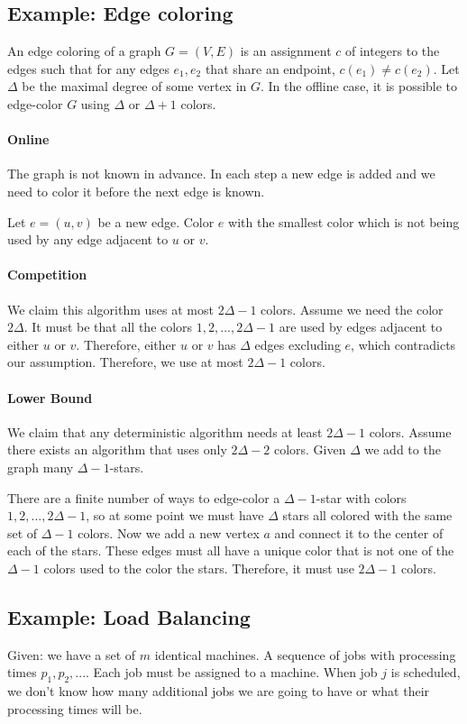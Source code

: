 \documentclass[a4paper]{article}
\begin{document}
\subsection{Example: Edge coloring}
An edge coloring of a graph $G=(V,E)$ is an assignment $c$ of integers to the edges such that for any edges $e_1, e_2$ that share an endpoint, $c(e_1) \ne c(e_2)$.
Let $\Delta$ be the maximal degree of some vertex in $G$.
In the offline case, it is possible to edge-color $G$ using $\Delta$ or $\Delta+1$ colors.

\paragraph{Online}
The graph is not known in advance. In each step a new edge is added and we need to color it before the next edge is known.

Let $e=(u,v)$ be a new edge.
Color $e$ with the smallest color which is not being used by any edge adjacent to $u$ or $v$.

\paragraph{Competition}
We claim this algorithm uses at most $2\Delta-1$ colors.
Assume we need the color $2\Delta$. It must be that all the colors $1,2,...,2\Delta-1$ are used by edges adjacent to either $u$ or $v$.
Therefore, either $u$ or $v$ has $\Delta$ edges excluding $e$, which contradicts our assumption.
Therefore, we use at most $2\Delta-1$ colors.

\paragraph{Lower Bound}
We claim that any deterministic algorithm needs at least $2\Delta-1$ colors.
Assume there exists an algorithm that uses only $2\Delta-2$ colors.
Given $\Delta$ we add to the graph many $\Delta-1$-stars.

There are a finite number of ways to edge-color a $\Delta-1$-star with colors $1,2,...,2\Delta-1$, so at some point we must have $\Delta$ stars all colored with the same set of $\Delta-1$ colors.
Now we add a new vertex $a$ and connect it to the center of each of the stars.
These edges must all have a unique color that is not one of the $\Delta-1$ colors used to the color the stars.
Therefore, it must use $2\Delta-1$ colors.

\subsection{Example: Load Balancing}
Given: we have a set of $m$ identical machines. A sequence of jobs with processing times $p_1,p_2,...$. Each job must be assigned to a machine. When job $j$ is scheduled, we don't know how many additional jobs we are going to have or what their processing times will be.
\end{document}
